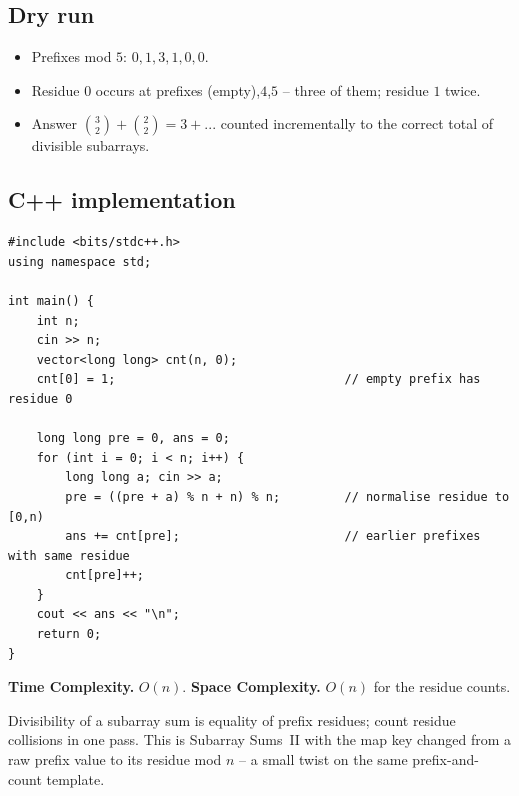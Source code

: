 \subsection*{Dry run}


\begin{itemize}
  \item Prefixes mod $5$: $0,1,3,1,0,0$.
  \item Residue $0$ occurs at prefixes (empty),$4$,$5$ -- three of them;
        residue $1$ twice.
  \item Answer $\binom{3}{2}+\binom{2}{2}=3+... $ counted incrementally to
        the correct total of divisible subarrays.
\end{itemize}

\subsection*{C++ implementation}

\begin{lstlisting}
#include <bits/stdc++.h>
using namespace std;

int main() {
    int n;
    cin >> n;
    vector<long long> cnt(n, 0);
    cnt[0] = 1;                                // empty prefix has residue 0

    long long pre = 0, ans = 0;
    for (int i = 0; i < n; i++) {
        long long a; cin >> a;
        pre = ((pre + a) % n + n) % n;         // normalise residue to [0,n)
        ans += cnt[pre];                       // earlier prefixes with same residue
        cnt[pre]++;
    }
    cout << ans << "\n";
    return 0;
}
\end{lstlisting}

\begin{complexitybox}
\textbf{Time Complexity.} $O(n)$. \textbf{Space Complexity.} $O(n)$ for the
residue counts.
\end{complexitybox}

\begin{takeawaybox}
Divisibility of a subarray sum is equality of prefix residues; count
residue collisions in one pass. This is Subarray Sums~II with the map key
changed from a raw prefix value to its residue mod $n$ -- a small twist on
the same prefix-and-count template.
\end{takeawaybox}
